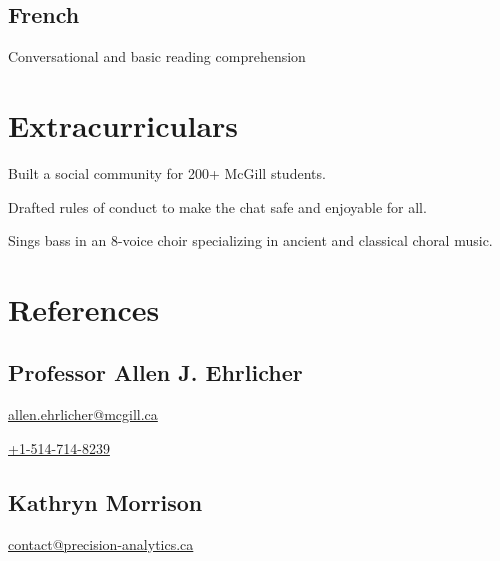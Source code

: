 \documentclass[]{jidicula-resume}
\begin{document}
\subsection{French}
Conversational and basic reading comprehension
\sectionsep

\section{Extracurriculars}
 
\vspace{\topsep}
\begin{tightemize}
\item Built a social community for 200+ McGill students.
\item Drafted rules of conduct to make the chat safe and enjoyable for all.
\end{tightemize}
\sectionsep
{} 
\vspace{\topsep}
\begin{tightemize}
\item Sings bass in an 8-voice choir specializing in ancient and classical choral music.
\end{tightemize}
\sectionsep


\section{References}
\subsection{Professor Allen J. Ehrlicher}
\href{mailto:allen.ehrlicher@mcgill.ca}{allen.ehrlicher@mcgill.ca}

\href{tel:15147148239}{+1-514-714-8239}
\sectionsep

\subsection{Kathryn Morrison}
\href{mailto:contact@precision-analytics.ca}{contact@precision-analytics.ca}
\end{document}
